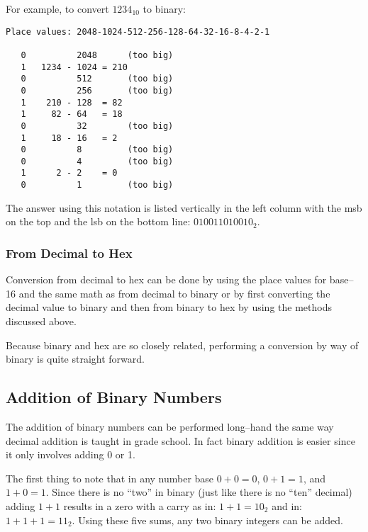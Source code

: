 For example, to convert $1234_{10}$ to binary:

\begin{verbatim}
Place values: 2048-1024-512-256-128-64-32-16-8-4-2-1

   0          2048      (too big)
   1   1234 - 1024 = 210
   0          512       (too big)
   0          256       (too big)
   1    210 - 128  = 82
   1     82 - 64   = 18
   0          32        (too big)
   1     18 - 16   = 2
   0          8         (too big)
   0          4         (too big)
   1      2 - 2    = 0
   0          1         (too big)
\end{verbatim}

The answer using this notation is listed vertically
in the left column with the \acrshort{msb} on the top and 
the \acrshort{lsb} on the bottom line: $010011010010_2$.


\subsubsection{From Decimal to Hex}

Conversion from decimal to hex can be done by using the place
values for base--16 and the same math as from decimal to binary
or by first converting the decimal value to binary and then
from binary to hex by using the methods discussed above.

Because binary and hex are so closely related, performing
a conversion by way of binary is quite straight forward.


\subsection{Addition of Binary Numbers}

The addition of binary numbers can be performed long--hand the
same way decimal addition is taught in grade school.  In fact binary
addition is easier since it only involves adding 0 or 1.

The first thing to note that in any number base $0+0=0$, $0+1=1$, and 
$1+0=1$.  Since there is no ``two'' in binary (just like there is 
no ``ten'' decimal) adding $1+1$ results in a zero with a carry as
in: $1+1=10_2$ and in: $1+1+1=11_2$.  Using these five sums, any two
binary integers can be added.

